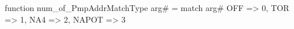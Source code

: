 function num_of_PmpAddrMatchType arg# = match arg# {
  OFF => 0,
  TOR => 1,
  NA4 => 2,
  NAPOT => 3
}
